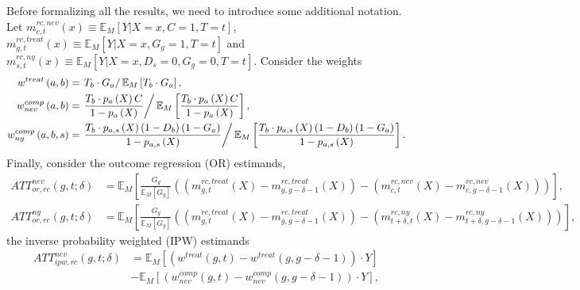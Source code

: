 \documentclass[11pt]{article}%
\theoremstyle{plain}
\numberwithin{sassumption}{section}
\numberwithin{equation}{section}
\begin{document}
{\small Before formalizing all the results, we need to introduce some
additional notation. Let $m_{c,t}^{rc,nev}\left(  x\right)  \equiv
\mathbb{E}_{M}[Y|X=x,C=1,T=t]$, $m_{g,t}^{rc,treat}\left(  x\right)
\equiv\mathbb{E}_{M}[Y|X=x,G_{g}=1,T=t]$ and $m_{s,t}^{rc,ny}\left(  x\right)
\equiv\mathbb{E}_{M}[Y|X=x,D_{s}=0,G_{g}=0,T=t]$. Consider the weights%
\begin{align*}
w^{treat}\left(  a,b\right)   &  =\left.  T_{b}\cdot G_{a}\right/
\mathbb{E}_{M}\left[  T_{b}\cdot G_{a}\right]  ,\\
w_{nev}^{comp}\left(  a,b\right)   &  =\left.  \dfrac{T_{b}\cdot p_{a}\left(
X\right)  C}{1-p_{a}\left(  X\right)  }\right/  \mathbb{E}_{M}\left[
\dfrac{T_{b}\cdot p_{a}\left(  X\right)  C}{1-p_{a}\left(  X\right)  }\right]
,\\
w_{ny}^{comp}\left(  a,b,s\right)   &  =\left.  \dfrac{T_{b}\cdot
p_{a,s}\left(  X\right)  \left(  1-D_{b}\right)  \left(  1-G_{a}\right)
}{1-p_{a,s}\left(  X\right)  }\right/  \mathbb{E}_{M}\left[  \dfrac{T_{b}\cdot
p_{a,s}\left(  X\right)  \left(  1-D_{b}\right)  \left(  1-G_{a}\right)
}{1-p_{a,s}\left(  X\right)  }\right]  .
\end{align*}
Finally, consider the outcome regression (OR) estimands,%
\begin{align*}
ATT_{or,rc}^{nev}\left(  g,t;\delta\right)   &  =\mathbb{E}_{M}\left[
\frac{G_{g}}{\mathbb{E}_{M}\left[  G_{g}\right]  }\left(  \left(
m_{g,t}^{rc,treat}\left(  X\right)  -m_{g,g-\delta-1}^{rc,treat}\left(
X\right)  \right)  -\left(  m_{c,t}^{rc,nev}\left(  X\right)  -m_{c,g-\delta
-1}^{rc,nev}\left(  X\right)  \right)  \right)  \right]  ,\\
ATT_{or,rc}^{ny}\left(  g,t;\delta\right)   &  =\mathbb{E}_{M}\left[
\frac{G_{g}}{\mathbb{E}_{M}\left[  G_{g}\right]  }\left(  \left(
m_{g,t}^{rc,treat}\left(  X\right)  -m_{g,g-\delta-1}^{rc,treat}\left(
X\right)  \right)  -\left(  m_{t+\delta,t}^{rc,ny}\left(  X\right)
-m_{t+\delta,g-\delta-1}^{rc,ny}\left(  X\right)  \right)  \right)  \right]  ,
\end{align*}
the inverse probability weighted (IPW) estimands%
\begin{align*}
ATT_{ipw,rc}^{nev}\left(  g,t;\delta\right)   &  =\mathbb{E}_{M}\left[
\left(  w^{treat}\left(  g,t\right)  -w^{treat}\left(  g,g-\delta-1\right)
\right)  \cdot Y\right] \\
&  -\mathbb{E}_{M}\left[  \left(  w_{nev}^{comp}\left(  g,t\right)
-w_{nev}^{comp}\left(  g,g-\delta-1\right)  \right)  \cdot Y\right]  ,\\

\end{align*}}
\end{document}
